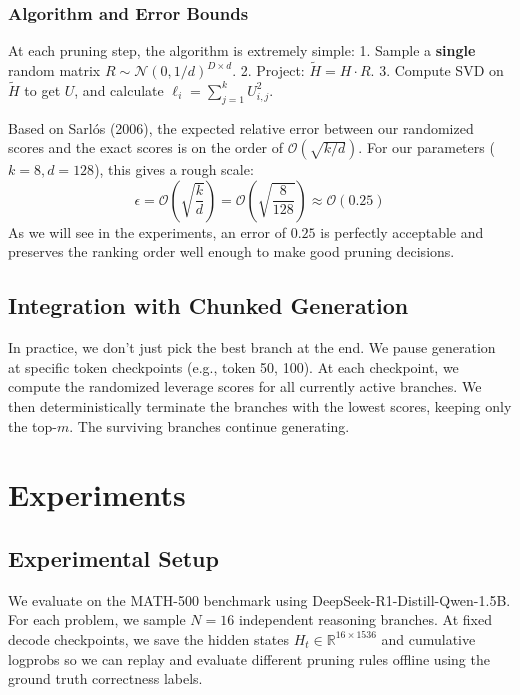 \documentclass[11pt]{article}
\begin{document}
\subsubsection{Algorithm and Error Bounds}

At each pruning step, the algorithm is extremely simple:
1. Sample a \textbf{single} random matrix $R \sim \mathcal{N}(0, 1/d)^{D \times d}$.
2. Project: $\tilde{H} = H \cdot R$.
3. Compute SVD on $\tilde{H}$ to get $U$, and calculate $\ell_i = \sum_{j=1}^k U_{i,j}^2$.

Based on Sarlós (2006), the expected relative error between our randomized scores and the exact scores is on the order of $\mathcal{O}(\sqrt{k/d})$. For our parameters ($k=8, d=128$), this gives a rough scale:
\begin{equation}
\epsilon = \mathcal{O}\!\left(\sqrt{\frac{k}{d}}\right) = \mathcal{O}\!\left(\sqrt{\frac{8}{128}}\right) \approx \mathcal{O}(0.25)
\end{equation}
As we will see in the experiments, an error of $0.25$ is perfectly acceptable and preserves the ranking order
 well enough to make good pruning decisions.

\subsection{Integration with Chunked Generation}

In practice, we don't just pick the best branch at the end. We pause generation at specific token checkpoints (e.g., token 50, 100). At each checkpoint, we compute the randomized leverage scores for all currently active branches. We then deterministically terminate the branches with the lowest scores, keeping only the top-$m$. The surviving branches continue generating.

\section{Experiments}
\label{sec:experiments}

\subsection{Experimental Setup}
We evaluate on the MATH-500 benchmark using DeepSeek-R1-Distill-Qwen-1.5B. For each problem, we sample $N=16$ independent reasoning branches. At fixed decode checkpoints, we save the hidden states $H_t \in
 \mathbb{R}^{16 \times 1536}$ and cumulative logprobs so we can replay and evaluate different pruning rules offline using the ground truth correctness labels.
\end{document}
